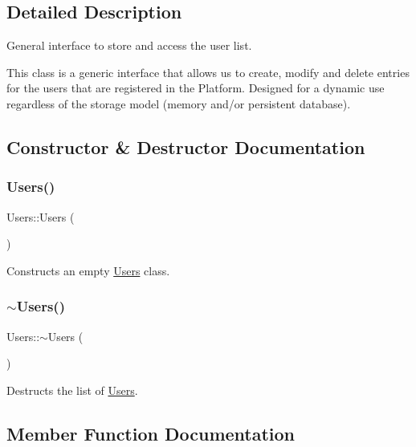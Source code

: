 \subsection{Detailed Description}
General interface to store and access the user list. 

This class is a generic interface that allows us to create, modify and delete entries for the users that are registered in the Platform. Designed for a dynamic use regardless of the storage model (memory and/or persistent database). 

\subsection{Constructor \& Destructor Documentation}
\mbox{\label{classUsers_af1f5c371c3f1e7f9b14210ed0d3718bc}} 
\subsubsection{\texorpdfstring{Users()}{Users()}}
{\footnotesize\ttfamily Users\+::\+Users (\begin{DoxyParamCaption}{ }\end{DoxyParamCaption})}

Constructs an empty \hyperlink{classUsers}{Users} class. \mbox{\label{classUsers_a33ff9aadcaef989bf3c8570358f791f6}} 
\subsubsection{\texorpdfstring{$\sim$\+Users()}{~Users()}}
{\footnotesize\ttfamily Users\+::$\sim$\+Users (\begin{DoxyParamCaption}{ }\end{DoxyParamCaption})}

Destructs the list of \hyperlink{classUsers}{Users}. 

\subsection{Member Function Documentation}
\mbox{\label{classUsers_a9c685e8e078273ac3d59f575ffe8cbf6}} 
